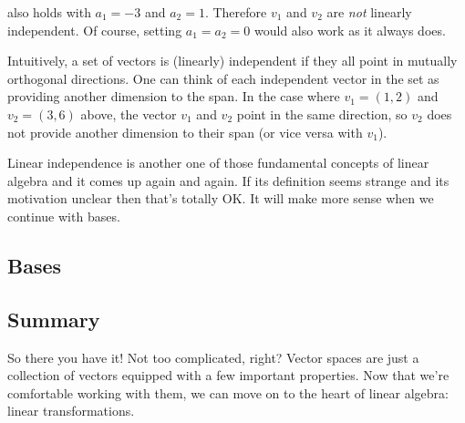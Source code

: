 \documentclass[12pt]{article}
\begin{document}
also holds with $a_1 = -3$ and $a_2 = 1$. Therefore $v_1$ and $v_2$ are \textit{not} linearly independent. Of course, setting $a_1 = a_2 = 0$ would also work as it always does.

Intuitively, a set of vectors is (linearly) independent if they all point in mutually orthogonal directions. One can think of each independent vector in the set as providing another dimension to the span. In the case where $v_1 = (1, 2)$ and $v_2 = (3, 6)$ above, the vector $v_1$ and $v_2$ point in the same direction, so $v_2$ does not provide another dimension to their span (or vice versa with $v_1$). 

Linear independence is another one of those fundamental concepts of linear algebra and it comes up again and again. If its definition seems strange and its motivation unclear then that's totally OK. It will make more sense when we continue with bases.

\subsection*{Bases}



\subsection*{Summary}

So there you have it! Not too complicated, right? Vector spaces are just a collection of vectors equipped with a few important properties. Now that we're comfortable working with them, we can move on to the heart of linear algebra:  linear transformations.
\end{document}
